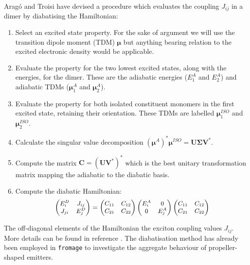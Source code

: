 Aragó and Troisi have devised a procedure which evaluates the coupling $J_{ij}$ in a dimer by diabatising the Hamiltonian:\cite{Arag2015}
\begin{enumerate}
    \item Select an excited state property. For the sake of argument we will use the transition dipole moment (TDM) $\bm{\mu}$ but anything bearing relation to the excited electronic density would be applicable.
    \item Evaluate the property for the two lowest excited states, along with the energies, for the dimer. These are the adiabatic energies ($E^A_1$ and $E^A_2$) and adiabatic TDMs ($\bm{\mu}^A_1$ and $\bm{\mu}^A_2$).
    \item Evaluate the property for both isolated constituent monomers in the first excited state, retaining their orientation. These TDMs are labelled $\bm{\mu}^{ISO}_1$ and $\bm{\mu}^{ISO}_2$.
    \item Calculate the singular value decomposition $(\bm{\mu}^A)^*\bm{\mu}^{ISO} = \bm{U}\bm{\Sigma}\bm{V}^*$.
    \item Compute the matrix $\bm{C} = (\bm{UV}^*)^*$ which is the best unitary transformation matrix mapping the adiabatic to the diabatic basis.
    \item Compute the diabatic Hamiltonian:
\begin{equation}
\small
\label{eq:2j}
\begin{pmatrix}
E_{i}^D & J_{ij}\\
J_{ji} & E_{j}^D
\end{pmatrix}
=
\begin{pmatrix}
C_{11} & C_{12}\\
C_{21} & C_{22}
\end{pmatrix}
\begin{pmatrix}
E_{i}^A & 0\\
0 & E_{j}^A
\end{pmatrix}
\begin{pmatrix}
C_{11} & C_{12}\\
C_{21} & C_{22}
\end{pmatrix}
\nonumber
\end{equation}     

\end{enumerate}

The off-diagonal elements of the Hamiltonian the exciton coupling values $J_{ij}$. More details can be found in reference . The diabatisation method has already been employed in \texttt{fromage} to investigate the aggregate behaviour of propeller-shaped emitters.\cite{Stojanovic2019}

